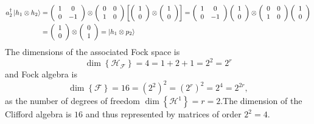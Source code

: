 \documentclass[aps,preprint]{revtex4}%
\begin{document}
\begin{align}
a_{2}^{\dagger}\left\vert h_{1}\otimes h_{2}\right\rangle  &  =\left(
\begin{array}
[c]{cc}%
1 & 0\\
0 & -1
\end{array}
\right)  \otimes\left(
\begin{array}
[c]{cc}%
0 & 0\\
1 & 0
\end{array}
\right)  \left[  \left(
\begin{array}
[c]{c}%
1\\
0
\end{array}
\right)  \otimes\left(
\begin{array}
[c]{c}%
1\\
0
\end{array}
\right)  \right]  =\left(
\begin{array}
[c]{cc}%
1 & 0\\
0 & -1
\end{array}
\right)  \left(
\begin{array}
[c]{c}%
1\\
0
\end{array}
\right)  \otimes\left(
\begin{array}
[c]{cc}%
0 & 0\\
1 & 0
\end{array}
\right)  \left(
\begin{array}
[c]{c}%
1\\
0
\end{array}
\right) \\
&  =\left(
\begin{array}
[c]{c}%
1\\
0
\end{array}
\right)  \otimes\left(
\begin{array}
[c]{c}%
0\\
1
\end{array}
\right)  =\left\vert h_{1}\otimes p_{2}\right\rangle
\end{align}
The dimensions of the associated Fock space is
\begin{equation}
\dim\left\{  \mathcal{H}_{\mathcal{F}}\right\}  =4=1+2+1=2^{2}=2^{r}%
\end{equation}
and Fock algebra is
\begin{equation}
\dim\left\{  \mathcal{F}\right\}  =16=\left(  2^{2}\right)  ^{2}=\left(
2^{r}\right)  ^{2}=2^{4}=2^{2r},
\end{equation}
as the number of degrees of freedom $\dim\left\{  \mathcal{H}^{1}\right\}
=r=2.$The dimension of the Clifford algebra is $16$ and thus represented by
matrices of order $2^{2}=4.$
\end{document}
